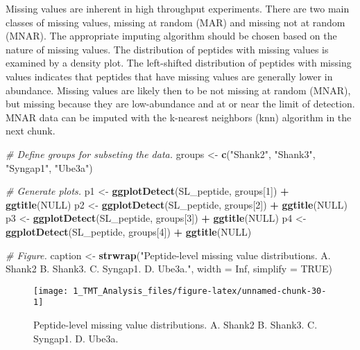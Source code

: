 \documentclass[]{article}
\newenvironment{Shaded}{\begin{snugshade}}{\end{snugshade}}
\newcommand{\KeywordTok}[1]{\textcolor[rgb]{0.13,0.29,0.53}{\textbf{#1}}}
\newcommand{\DataTypeTok}[1]{\textcolor[rgb]{0.13,0.29,0.53}{#1}}
\newcommand{\DecValTok}[1]{\textcolor[rgb]{0.00,0.00,0.81}{#1}}
\newcommand{\StringTok}[1]{\textcolor[rgb]{0.31,0.60,0.02}{#1}}
\newcommand{\CommentTok}[1]{\textcolor[rgb]{0.56,0.35,0.01}{\textit{#1}}}
\newcommand{\OtherTok}[1]{\textcolor[rgb]{0.56,0.35,0.01}{#1}}
\newcommand{\OperatorTok}[1]{\textcolor[rgb]{0.81,0.36,0.00}{\textbf{#1}}}
\newcommand{\NormalTok}[1]{#1}
\begin{document}
Missing values are inherent in high throughput experiments. There are
two main classes of missing values, missing at random (MAR) and missing
not at random (MNAR). The appropriate imputing algorithm should be
chosen based on the nature of missing values. The distribution of
peptides with missing values is examined by a density plot. The
left-shifted distribution of peptides with missing values indicates that
peptides that have missing values are generally lower in abundance.
Missing values are likely then to be not missing at random (MNAR), but
missing because they are low-abundance and at or near the limit of
detection. MNAR data can be imputed with the k-nearest neighbors (knn)
algorithm in the next chunk.

\begin{Shaded}
\begin{Highlighting}[]
\CommentTok{# Define groups for subseting the data.}
\NormalTok{groups <-}\StringTok{ }\KeywordTok{c}\NormalTok{(}\StringTok{"Shank2"}\NormalTok{, }\StringTok{"Shank3"}\NormalTok{, }\StringTok{"Syngap1"}\NormalTok{, }\StringTok{"Ube3a"}\NormalTok{)}

\CommentTok{# Generate plots.}
\NormalTok{p1 <-}\StringTok{ }\KeywordTok{ggplotDetect}\NormalTok{(SL_peptide, groups[}\DecValTok{1}\NormalTok{]) }\OperatorTok{+}\StringTok{ }\KeywordTok{ggtitle}\NormalTok{(}\OtherTok{NULL}\NormalTok{)}
\NormalTok{p2 <-}\StringTok{ }\KeywordTok{ggplotDetect}\NormalTok{(SL_peptide, groups[}\DecValTok{2}\NormalTok{]) }\OperatorTok{+}\StringTok{ }\KeywordTok{ggtitle}\NormalTok{(}\OtherTok{NULL}\NormalTok{)}
\NormalTok{p3 <-}\StringTok{ }\KeywordTok{ggplotDetect}\NormalTok{(SL_peptide, groups[}\DecValTok{3}\NormalTok{]) }\OperatorTok{+}\StringTok{ }\KeywordTok{ggtitle}\NormalTok{(}\OtherTok{NULL}\NormalTok{)}
\NormalTok{p4 <-}\StringTok{ }\KeywordTok{ggplotDetect}\NormalTok{(SL_peptide, groups[}\DecValTok{4}\NormalTok{]) }\OperatorTok{+}\StringTok{ }\KeywordTok{ggtitle}\NormalTok{(}\OtherTok{NULL}\NormalTok{)}

\CommentTok{# Figure.}
\NormalTok{caption <-}\StringTok{ }\KeywordTok{strwrap}\NormalTok{(}\StringTok{"Peptide-level missing value distributions. A. Shank2 B. Shank3. }
\StringTok{                   C. Syngap1. D. Ube3a."}\NormalTok{, }\DataTypeTok{width =} \OtherTok{Inf}\NormalTok{, }\DataTypeTok{simplify =} \OtherTok{TRUE}\NormalTok{)}
\end{Highlighting}
\end{Shaded}

\begin{figure}

{\centering \texttt{[image: 1\_TMT\_Analysis\_files/figure-latex/unnamed-chunk-30-1]} 

}

\caption{Peptide-level missing value distributions. A. Shank2 B. Shank3.  C. Syngap1. D. Ube3a.}\label{fig:unnamed-chunk-30}
\end{figure}
\end{document}
